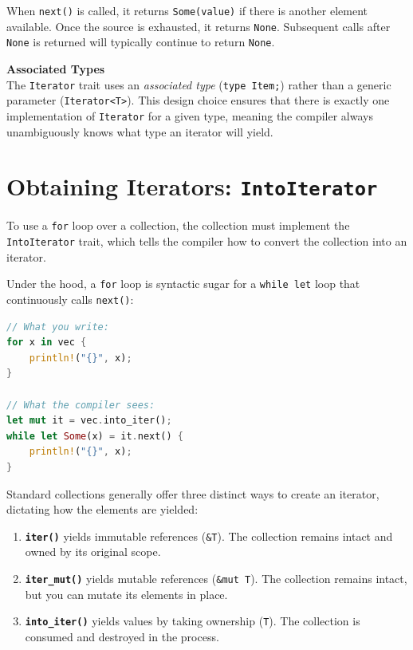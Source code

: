 When \texttt{next()} is called, it returns \texttt{Some(value)} if there is another element available. Once the source is exhausted, it returns \texttt{None}. Subsequent calls after \texttt{None} is returned will typically continue to return \texttt{None}.

\begin{notebox}
\textbf{Associated Types} \\
The \texttt{Iterator} trait uses an \textit{associated type} (\texttt{type Item;}) rather than a generic parameter (\texttt{Iterator<T>}). This design choice ensures that there is exactly one implementation of \texttt{Iterator} for a given type, meaning the compiler always unambiguously knows what type an iterator will yield.
\end{notebox}

\section{Obtaining Iterators: \texttt{IntoIterator}}
To use a \texttt{for} loop over a collection, the collection must implement the \texttt{IntoIterator} trait, which tells the compiler how to convert the collection into an iterator. 

Under the hood, a \texttt{for} loop is syntactic sugar for a \texttt{while let} loop that continuously calls \texttt{next()}:

\begin{lstlisting}[language=Rust]
// What you write:
for x in vec {
    println!("{}", x);
}

// What the compiler sees:
let mut it = vec.into_iter();
while let Some(x) = it.next() {
    println!("{}", x);
}
\end{lstlisting}

Standard collections generally offer three distinct ways to create an iterator, dictating how the elements are yielded:

\begin{enumerate}
    \item \textbf{\texttt{iter()}} yields immutable references (\texttt{\&T}). The collection remains intact and owned by its original scope.
    \item \textbf{\texttt{iter\_mut()}} yields mutable references (\texttt{\&mut T}). The collection remains intact, but you can mutate its elements in place.
    \item \textbf{\texttt{into\_iter()}} yields values by taking ownership (\texttt{T}). The collection is consumed and destroyed in the process.
\end{enumerate}

